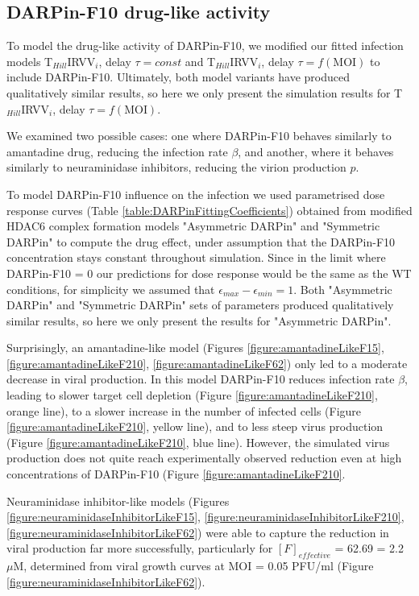 \subsection{DARPin-F10 drug-like activity}

To model the drug-like activity of DARPin-F10, we modified our fitted infection models T$_{Hill}$IRVV$_i$, delay $\tau = const$ and T$_{Hill}$IRVV$_i$, delay $\tau = f(\text{MOI})$ to include DARPin-F10. Ultimately, both model variants have produced qualitatively similar results, so here we only present the simulation results for T$_{Hill}$IRVV$_i$, delay $\tau = f(\text{MOI})$.

We examined two possible cases: one where DARPin-F10 behaves similarly to amantadine drug, reducing the infection rate $\beta$, and another, where it behaves similarly to neuraminidase inhibitors, reducing the virion production $p$.

To model DARPin-F10 influence on the infection we used parametrised dose response curves (Table \ref{table:DARPinFittingCoefficients}) obtained from modified HDAC6 complex formation models "Asymmetric DARPin" and "Symmetric DARPin" to compute the drug effect, under assumption that the DARPin-F10 concentration stays constant throughout simulation. Since in the limit where DARPin-F10 = 0 our predictions for dose response would be the same as the WT conditions, for simplicity we assumed that $\epsilon_{max} - \epsilon_{min} = 1$. Both "Asymmetric DARPin" and "Symmetric DARPin"  sets of parameters produced qualitatively similar results, so here we only present the results for "Asymmetric DARPin".

Surprisingly, an amantadine-like model (Figures \ref{figure:amantadineLikeF15}, \ref{figure:amantadineLikeF210}, \ref{figure:amantadineLikeF62}) only led to a moderate decrease in viral production. In this model DARPin-F10 reduces infection rate $\beta$, leading to slower target cell depletion (Figure \ref{figure:amantadineLikeF210}, orange line), to a slower increase in the number of infected cells (Figure \ref{figure:amantadineLikeF210}, yellow line), and to less steep virus production (Figure \ref{figure:amantadineLikeF210}, blue line). However, the simulated virus production does not quite reach experimentally observed reduction even at high concentrations of DARPin-F10 (Figure \ref{figure:amantadineLikeF210}.

Neuraminidase inhibitor-like models (Figures \ref{figure:neuraminidaseInhibitorLikeF15}, \ref{figure:neuraminidaseInhibitorLikeF210}, \ref{figure:neuraminidaseInhibitorLikeF62}) were able to capture the reduction in viral production far more successfully, particularly for $[F]_{effective}$ = 62.69 = 2.2 $\mu$M, determined from viral growth curves at MOI = 0.05 PFU/ml (Figure \ref{figure:neuraminidaseInhibitorLikeF62}).

